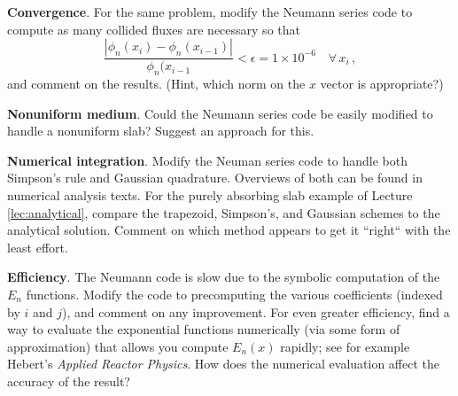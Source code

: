 \begin{exercises}
  \item \textbf{Convergence}. For the same problem, modify the Neumann series code to compute as many collided fluxes are necessary so that
  \begin{equation*}
   \frac{|\phi_n(x_i)-\phi_n(x_{i-1})|}{\phi_n(x_{i-1}} < \epsilon = 1\times10^{-6} \, \, \, \, \, \, \forall \, x_i \, ,
  \end{equation*}
   and comment on the results. (Hint, which norm on the $x$ vector is appropriate?)
  
  \item \textbf{Nonuniform medium}. Could the Neumann series code be easily modified to handle a nonuniform slab?  Suggest an approach for this.

  \item \textbf{Numerical integration}. Modify the Neuman series code to handle both Simpson's rule and Gaussian quadrature.  Overviews of both can be found in numerical analysis texts.  For the purely absorbing slab example of Lecture \ref{lec:analytical}, compare the trapezoid, Simpson's, and Gaussian schemes to the analytical solution.  Comment on which method appears to get it ``right`` with the least effort.

  \item \textbf{Efficiency}.  The Neumann code is slow due to the symbolic computation of the $E_n$ functions. Modify the code to precomputing the various coefficients (indexed by $i$ and $j$), and comment on any improvement.  For even greater efficiency, find a way to evaluate the exponential functions numerically (via some form of approximation) that allows you compute $E_n(x)$ rapidly; see for example Hebert's \textit{Applied Reactor Physics}.  How does the numerical evaluation affect the accuracy of the result?


\end{exercises}
